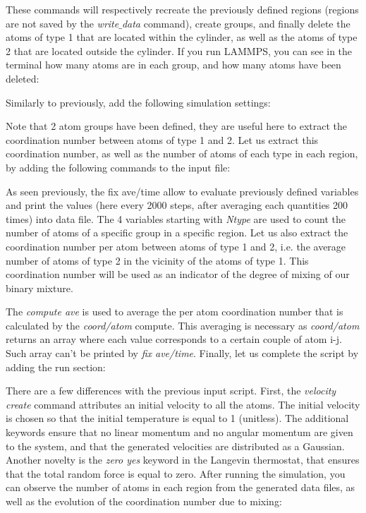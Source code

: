 \vspace{0.5cm} \noindent These commands will respectively recreate
the previously defined regions (regions are not saved by the
\textit{write$\_$data} command), create groups, and finally delete the
atoms of type 1 that are located within the cylinder, as
well as the atoms of type 2 that are located outside the
cylinder. If you run LAMMPS, you can see in the terminal how
many atoms are in each group, and how many atoms have been
deleted:

\vspace{0.5cm} \noindent Similarly to previously, add the following simulation
settings:

\vspace{0.5cm} \noindent Note that 2 atom groups have been defined, they are useful
here to extract the coordination number between atoms of
type 1 and 2. Let us extract this coordination number, as
well as the number of atoms of each type in each region, by
adding the following commands to the input file:

\vspace{0.5cm} \noindent As seen previously, the fix ave/time
allow to evaluate previously defined variables and print
the values (here every 2000 steps, after averaging each quantities 200 times)
into data file. The 4 variables starting with \textit{Ntype} are used to count
the number of atoms of a specific group in a specific
region. 
Let us also extract the coordination number per atom between atoms 
of type 1 and 2, i.e. the average number of atoms of type 2 in the vicinity 
of the atoms of type 1. This coordination number will be used as an indicator of the 
degree of mixing of our binary mixture. 

\vspace{0.5cm} \noindent The \textit{compute ave} is used to average the per atom
coordination number that is calculated by the \textit{coord/atom} compute.
This averaging is necessary as \textit{coord/atom} returns an array where each value corresponds 
to a certain couple of atom i-j. Such array can't be printed by \textit{fix ave/time}. 
Finally, let us complete the script by adding the run section:

\vspace{0.5cm} \noindent There are a few differences with the
previous input script. First, the \textit{velocity create}
command attributes an initial velocity to all the atoms.
The initial velocity is chosen so that the initial
temperature is equal to 1 (unitless). The additional
keywords ensure that no linear momentum and no angular
momentum are given to the system, and that the generated
velocities are distributed as a Gaussian. Another novelty
is the \textit{zero yes} keyword in the Langevin thermostat, that
ensures that the total random force is equal to zero.
After running the simulation, you can observe the number
of atoms in each region from the generated data files, as
well as the evolution of the coordination number due to
mixing:

